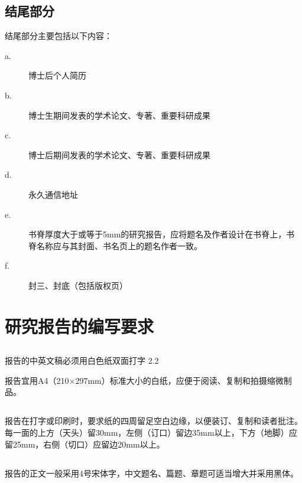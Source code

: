 \subsection{结尾部分}

结尾部分主要包括以下内容：

\begin{description}

\item[a.] 博士后个人简历

\item[b.] 博士生期间发表的学术论文、专著、重要科研成果

\item[c.] 博士后期间发表的学术论文、专著、重要科研成果

\item[d.] 永久通信地址

\item[e.] 书脊厚度大于或等于5mm的研究报告，应将题名及作者设计在书脊上，书脊名称应与其封面、书名页上的题名作者一致。

\item[f.] 封三、封底（包括版权页）

\end{description}


\section{研究报告的编写要求}


\subsection{}

报告的中英文稿必须用白色纸双面打字 2.2

报告宜用A4（210×297mm）标准大小的白纸，应便于阅读、复制和拍摄缩微制品。


\subsection{}

报告在打字或印刷时，要求纸的四周留足空白边缘，以便装订、复制和读者批注。每一面的上方（天头）留30mm，左侧（订口）留边35mm以上，下方（地脚）应留25mm，右侧（切口）应留边20mm以上。


\subsection{}

报告的正文一般采用4号宋体字，中文题名、篇题、章题可适当增大并采用黑体。


